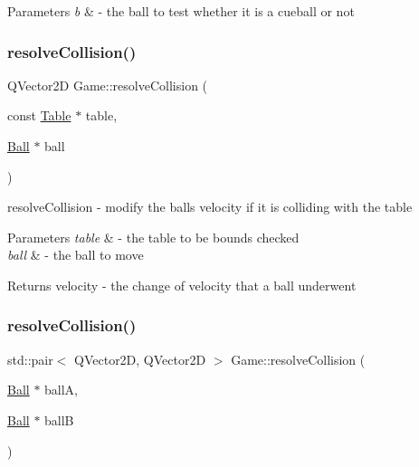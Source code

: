 \begin{DoxyParams}{Parameters}
{\em b} & -\/ the ball to test whether it is a cueball or not \\
\hline
\end{DoxyParams}
\mbox{\label{class_game_a8063ed6374c6bbadad0cbe71364fe764}} 
\subsubsection{\texorpdfstring{resolve\+Collision()}{resolveCollision()}\hspace{0.1cm}{\footnotesize\ttfamily [1/2]}}
{\footnotesize\ttfamily Q\+Vector2D Game\+::resolve\+Collision (\begin{DoxyParamCaption}\item[{const \mbox{\hyperlink{class_table}{Table}} $\ast$}]{table,  }\item[{\mbox{\hyperlink{class_ball}{Ball}} $\ast$}]{ball }\end{DoxyParamCaption})}



resolve\+Collision -\/ modify the ball\textquotesingle{}s velocity if it is colliding with the table 


\begin{DoxyParams}{Parameters}
{\em table} & -\/ the table to be bounds checked \\
\hline
{\em ball} & -\/ the ball to move \\
\hline
\end{DoxyParams}
\begin{DoxyReturn}{Returns}
velocity -\/ the change of velocity that a ball underwent 
\end{DoxyReturn}
\mbox{\label{class_game_ac7de6f8d4a2131befbf6dbcccb6921f1}} 
\subsubsection{\texorpdfstring{resolve\+Collision()}{resolveCollision()}\hspace{0.1cm}{\footnotesize\ttfamily [2/2]}}
{\footnotesize\ttfamily std\+::pair$<$ Q\+Vector2D, Q\+Vector2D $>$ Game\+::resolve\+Collision (\begin{DoxyParamCaption}\item[{\mbox{\hyperlink{class_ball}{Ball}} $\ast$}]{ballA,  }\item[{\mbox{\hyperlink{class_ball}{Ball}} $\ast$}]{ballB }\end{DoxyParamCaption})}



